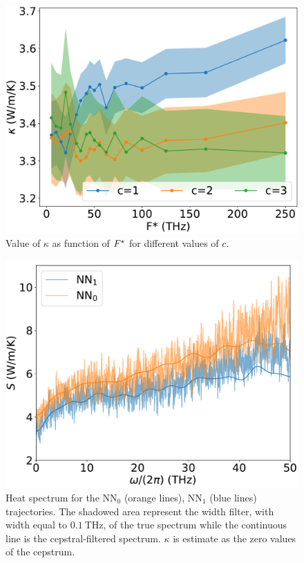 \documentclass[%
 reprint,
 amsmath,amssymb,
 aps,
prb,
]{revtex4-2}
\begin{document}
\begin{figure}[tbh]
    \centering
    \includegraphics[width=\linewidth]{figs/kappa_corr_Fstar_1.pdf}
    \caption{Value of $\kappa$ as function  of $F^{\star}$ for different values of $c$. }
    \label{fig:kappa1}
\end{figure}


\begin{figure}[tbh]
    \centering
    \includegraphics[width=\linewidth]{figs/Spettro_12.pdf}
    \caption{Heat spectrum for the NN$_0$ (orange lines), NN$_1$ (blue lines) trajectories. The shadowed area represent the width filter, with width equal to $0.1~$THz, of the true spectrum while the continuous line is the cepstral-filtered spectrum. $\kappa$ is estimate as the zero values of the cepstrum.} 
    \label{fig:spettri}
\end{figure}


\end{document}
